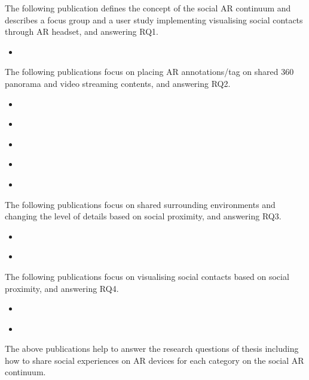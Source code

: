 The following publication defines the concept of the social AR continuum and describes a focus group and a user study implementing visualising social contacts through AR headset, and answering RQ1. 

\begin{itemize}
    \item{ }
\end{itemize}

The following publications focus on placing AR annotations/tag on shared 360 panorama and video streaming contents, and answering RQ2.

\begin{itemize}
    \item{ }
    \item{ }
    \item{ }    
    \item{ }
    \item{ }
\end{itemize}

The following publications focus on shared surrounding environments and changing the level of details based on social proximity, and answering RQ3.

\begin{itemize}
    \item{ }
    \item{ }
\end{itemize}

The following publications focus on visualising social contacts based on social proximity, and answering RQ4. 

\begin{itemize}
    \item{ }
    \item{ }
\end{itemize}

The above publications help to answer the research questions of thesis including how to share social experiences on AR devices for each category on the social AR continuum. 




